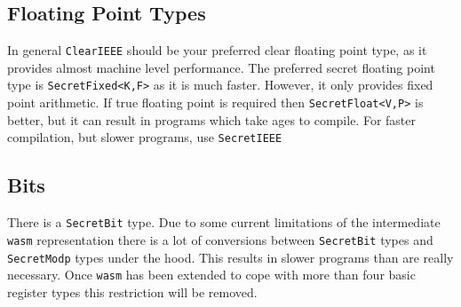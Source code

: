 \subsection{Floating Point Types}
In general \verb|ClearIEEE| should be your preferred clear floating
point type, as it provides almost machine level performance.
The preferred secret floating point type is \verb|SecretFixed<K,F>|
as it is much faster. However, it only provides fixed point arithmetic.
If true floating point is required then  \verb|SecretFloat<V,P>|
is better, but it can result in programs which take ages to compile.
For faster compilation, but slower programs, use  \verb|SecretIEEE|

\subsection{Bits}
There is a \verb|SecretBit| type. Due to some current limitations
of the intermediate \verb|wasm| representation there is a lot of
conversions between \verb|SecretBit| types and \verb|SecretModp|
types under the hood. This results in slower programs than are really
necessary. Once \verb|wasm| has been extended to cope with more than
four basic register types this restriction will be removed.

